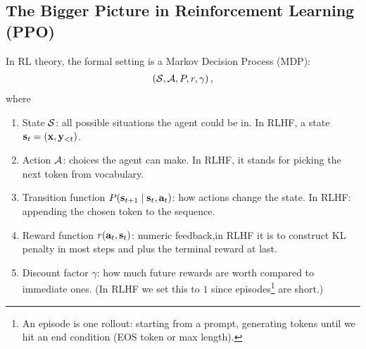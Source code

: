 \documentclass[11pt]{article}  %
\begin{document}
\subsection{The Bigger Picture in Reinforcement Learning (PPO)}
In RL theory, the formal setting is a Markov Decision Process (MDP):
\begin{align*}
  \left( \mathcal{S}, \mathcal{A}, P, r, \gamma \right),
\end{align*}
where 
\begin{enumerate}
  \item State $\mathcal{S}$: all possible situations the agent could be in.
  In RLHF, a state $\mathbf{s}_t = (\mathbf{x}, \mathbf{y}_{<t})$.
  \item Action $\mathcal{A}$: choices the agent can make.
  In RLHF, it stands for picking the next token from vocabulary.
  \item Transition function $P(\mathbf{s}_{t+1} \mid \mathbf{s}_t, \mathbf{a}_t)$: how actions change the state.
  In RLHF: appending the chosen token to the sequence.
  \item Reward function $r(\mathbf{a}_t, \mathbf{s}_t)$: numeric feedback,in RLHF it is to construct KL penalty in most steps and plus the terminal reward at last.
  \item Discount factor $\gamma$: how much future rewards are worth compared to immediate ones. (In RLHF we set this to $1$ since episodes\footnote{An episode is one rollout: starting from a prompt, generating tokens until we hit an end condition (EOS token or max length).} are short.) 
\end{enumerate}
\end{document}
